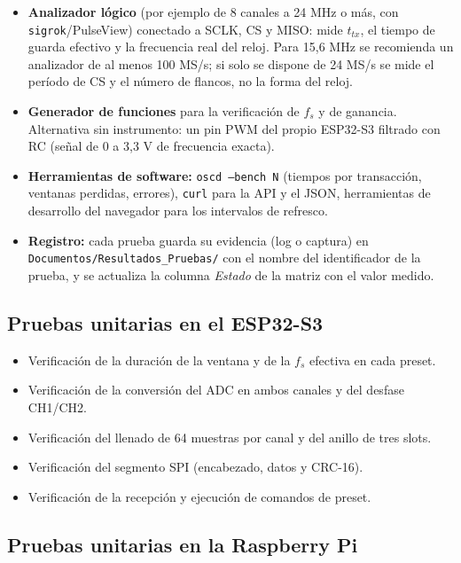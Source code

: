 \documentclass[12pt,a4paper]{article}
\begin{document}
\begin{itemize}
  \item \textbf{Analizador lógico} (por ejemplo de 8 canales a 24 MHz o más, con \texttt{sigrok}/PulseView) conectado a SCLK, CS y MISO: mide $t_{tx}$, el tiempo de guarda efectivo y la frecuencia real del reloj. Para 15{,}6 MHz se recomienda un analizador de al menos 100 MS/s; si solo se dispone de 24 MS/s se mide el período de CS y el número de flancos, no la forma del reloj.
  \item \textbf{Generador de funciones} para la verificación de $f_s$ y de ganancia. Alternativa sin instrumento: un pin PWM del propio ESP32-S3 filtrado con RC (señal de 0 a 3{,}3 V de frecuencia exacta).
  \item \textbf{Herramientas de software:} \texttt{oscd --bench N} (tiempos por transacción, ventanas perdidas, errores), \texttt{curl} para la API y el JSON, herramientas de desarrollo del navegador para los intervalos de refresco.
  \item \textbf{Registro:} cada prueba guarda su evidencia (log o captura) en \texttt{Documentos/Resultados\_Pruebas/} con el nombre del identificador de la prueba, y se actualiza la columna \emph{Estado} de la matriz con el valor medido.
\end{itemize}

\subsection{Pruebas unitarias en el ESP32-S3}

\begin{itemize}
  \item Verificación de la duración de la ventana y de la $f_s$ efectiva en cada preset.
  \item Verificación de la conversión del ADC en ambos canales y del desfase CH1/CH2.
  \item Verificación del llenado de 64 muestras por canal y del anillo de tres slots.
  \item Verificación del segmento SPI (encabezado, datos y CRC-16).
  \item Verificación de la recepción y ejecución de comandos de preset.
\end{itemize}

\subsection{Pruebas unitarias en la Raspberry Pi}
\end{document}
